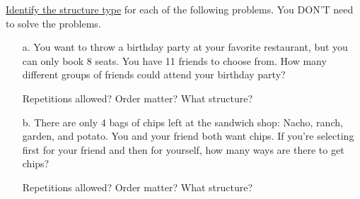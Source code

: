     \begin{questionNOGRADE}{\thequestion}
        \underline{Identify the structure type} for each of the following problems.
        You DON'T need to solve the problems.

        \begin{enumerate}
            \item[a.]   You want to throw a birthday party at your favorite restaurant,
                        but you can only book 8 seats. You have 11 friends to choose from.
                        How many different groups of friends could attend your birthday party?
                        \begin{center}
                            Repetitions allowed? \tab Order matter? \tab What structure?
                        \end{center}
                        
            \item[b.]   There are only 4 bags of chips left at the sandwich shop:
                        Nacho, ranch, garden, and potato. You and your friend both
                        want chips. If you're selecting first for your friend
                        and then for yourself, how many ways are there to get chips?
                        \begin{center}
                            Repetitions allowed? \tab Order matter? \tab What structure?
                        \end{center}
        \end{enumerate}
    \end{questionNOGRADE}

